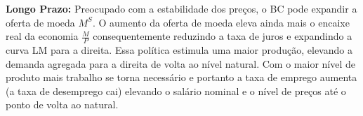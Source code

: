 \documentclass{article}
\begin{document}
\textbf{Longo Prazo:} Preocupado com a estabilidade dos preços, o BC pode expandir a oferta de moeda $M^S$. O aumento da oferta de moeda eleva ainda mais o encaixe real da economia $\frac{M}{P}$ consequentemente reduzindo a taxa de juros e expandindo a curva LM para a direita. Essa política estimula uma maior produção, elevando a demanda agregada para a direita de volta ao nível natural. Com o maior nível de produto mais trabalho se torna necessário e portanto a taxa de emprego aumenta (a taxa de desemprego cai) elevando o salário nominal e o nível de preços até o ponto de volta ao natural.
\end{document}
